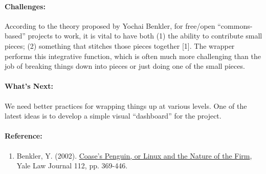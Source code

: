 \paragraph{Challenges:} According to the theory proposed by Yochai Benkler,
for free/open ``commons-based'' projects to work, it is vital to have
both (1) the ability to contribute small pieces; (2) something that
stitches those pieces together {[}1{]}. The wrapper performs this
integrative function, which is often much more challenging than the job
of breaking things down into pieces or just doing one of the small
pieces.

\paragraph{What's Next:}
We need better practices for wrapping things up at
various levels.  One of the latest ideas is to develop a simple visual
``dashboard'' for the project.

\paragraph{Reference:}

\begin{enumerate}
\itemsep1pt\parskip0pt
\item
  Benkler, Y.
  (2002). \href{http://www.yale.edu/yalelj/112/BenklerWEB.pdf}{Coase's
  Penguin, or Linux and the Nature of the Firm}, Yale Law Journal 112,
  pp. 369-446.
\end{enumerate}
